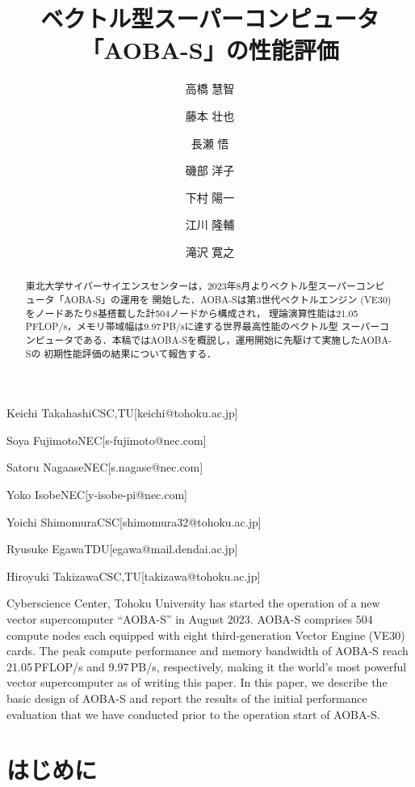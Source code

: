 ﻿\documentclass[submit,techrep,noauthor]{ipsj}
\begin{document}
\title{ベクトル型スーパーコンピュータ「AOBA-S」の性能評価}



\author{高橋 慧智}{Keichi Takahashi}{CSC,TU}[keichi@tohoku.ac.jp]
\author{藤本 壮也}{Soya Fujimoto}{NEC}[s-fujimoto@nec.com]
\author{長瀬 悟}{Satoru Nagaase}{NEC}[s.nagase@nec.com]
\author{磯部 洋子}{Yoko Isobe}{NEC}[y-isobe-pi@nec.com]
\author{下村 陽一}{Yoichi Shimomura}{CSC}[shimomura32@tohoku.ac.jp]
\author{江川 隆輔}{Ryusuke Egawa}{TDU}[egawa@mail.dendai.ac.jp]
\author{滝沢 寛之}{Hiroyuki Takizawa}{CSC,TU}[takizawa@tohoku.ac.jp]

\begin{abstract}
東北大学サイバーサイエンスセンターは，2023年8月よりベクトル型スーパーコンピュータ「AOBA-S」の運用を
開始した．AOBA-Sは第3世代ベクトルエンジン (VE30) をノードあたり8基搭載した計504ノードから構成され，
理論演算性能は21.05\,PFLOP/s，メモリ帯域幅は9.97\,PB/sに達する世界最高性能のベクトル型
スーパーコンピュータである．本稿ではAOBA-Sを概説し，運用開始に先駆けて実施したAOBA-Sの
初期性能評価の結果について報告する．
\end{abstract}

\begin{eabstract}
Cyberscience Center, Tohoku University has started the operation of a new vector supercomputer 
``AOBA-S'' in August 2023. AOBA-S comprises 504 compute nodes each equipped with eight
third-generation Vector Engine (VE30) cards. The peak compute performance and memory bandwidth of
AOBA-S reach 21.05\,PFLOP/s and 9.97\,PB/s, respectively, making it the world's most powerful vector
supercomputer as of writing this paper. In this paper, we describe the basic design of AOBA-S and
report the results of the initial performance evaluation that we have conducted prior to the
operation start of AOBA-S.
\end{eabstract}

\maketitle

\section{はじめに}
\end{document}
